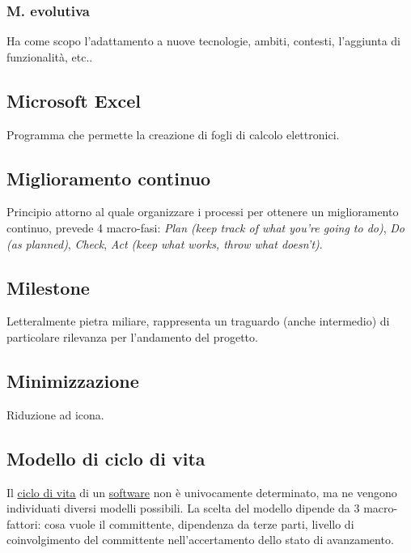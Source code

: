 		\subsubsection{M. evolutiva}
		Ha come scopo l'adattamento a nuove tecnologie, ambiti, contesti, l'aggiunta di funzionalità, etc..

	\subsection{Microsoft Excel}
	\label{sec:microsoftexcel}	
	Programma che permette la creazione di fogli di calcolo elettronici.

	\subsection{Miglioramento continuo}
	\label{sec:miglioramentocontinuo}
	Principio attorno al quale organizzare i processi per ottenere un miglioramento continuo, prevede 4 macro-fasi:
	\emph{Plan (keep track of what you're going to do)}, \emph{Do (as planned)}, \emph{Check}, \emph{Act (keep what works, throw what doesn't)}.

	\subsection{Milestone}
	\label{sec:milestone}	
	Letteralmente pietra miliare, rappresenta un traguardo (anche intermedio) di particolare rilevanza per l'andamento del progetto.
	
	\subsection{Minimizzazione}
	\label{sec:minimizzazione}
	Riduzione ad icona.

	\subsection{Modello di ciclo di vita}
	\label{sec:modelliciclodivita}
	Il \underline{\hyperref[sec:ciclodivita]{ciclo di vita}} di un \underline{\hyperref[sec:prodottosoftware]{software}} non è univocamente determinato, ma ne vengono individuati diversi modelli possibili. La scelta del modello dipende da 3 macro-fattori: cosa vuole il committente, dipendenza da terze parti, livello di coinvolgimento del committente nell'accertamento dello stato di avanzamento.

